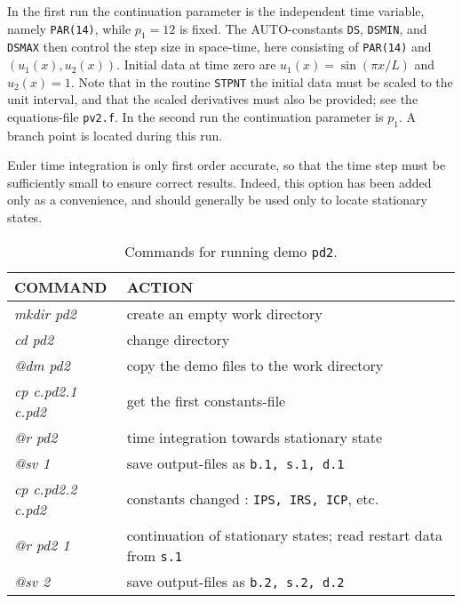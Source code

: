 \documentclass[12pt]{report}
\begin{document}
In the first run the continuation parameter is the independent time variable,
namely {\tt PAR(14)}, while $p_1=12$ is fixed.
The {\cal AUTO}-constants {\tt DS}, {\tt DSMIN}, and {\tt DSMAX} then control the step size
in space-time, here consisting of {\tt PAR(14)} and $(u_1(x),u_2(x))$.
Initial data at time zero are $u_1(x)=\sin(\pi x/L)$ and $u_2(x)=1$.
Note that in the routine {\tt STPNT} the initial data must be scaled to 
the unit interval, and that the scaled derivatives must also be provided; 
see the equations-file {\tt pv2.f}.
In the second run the continuation parameter is $p_1$.
A branch point is located during this run.

Euler time integration is only first order accurate, so that
the time step must be sufficiently small to ensure correct results.
Indeed, this option has been added only as a convenience, and should 
generally be used only to locate stationary states.


\begin{table}[htbp]
\begin{center}
\begin{tabular}{| l | l |}
\hline
  COMMAND  & ACTION \\
\hline
  {\it mkdir pd2} & create an empty work directory \\ 
  {\it cd pd2} & change directory \\
  {\it @dm pd2} & copy the demo files to the work directory \\
\hline
  {\it cp c.pd2.1 c.pd2} & get the first constants-file \\ 
  {\it @r pd2} & time integration towards stationary state \\ 
  {\it @sv 1} & save output-files as {\tt b.1, s.1, d.1} \\ 
\hline
  {\it cp c.pd2.2 c.pd2} & constants changed : {\tt IPS, IRS, ICP}, etc.  \\ 
  {\it @r pd2 1} & continuation of stationary states; read restart data from {\tt s.1} \\ 
  {\it @sv 2} & save output-files as {\tt b.2, s.2, d.2} \\ 
\hline
\end{tabular}
\caption{Commands for running demo {\tt pd2}.}
\label{tbl:demo_pd2}
\end{center}
\end{table}
\end{document}
